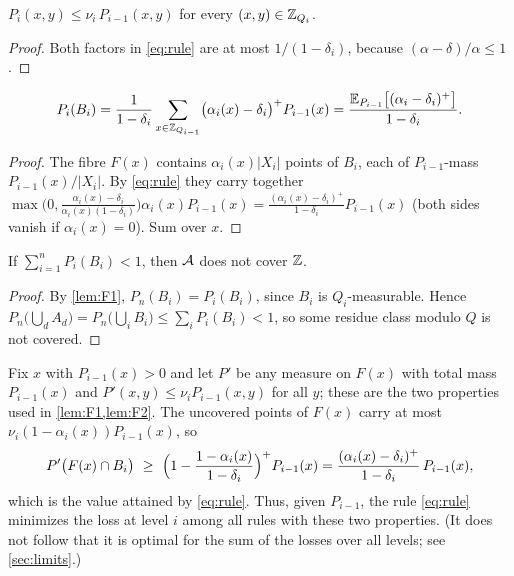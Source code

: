 \begin{lemma}\label{lem:F2}
$P_i(x,y)\le\nu_i\,P_{i-1}(x,y)$ for every $(x,y)\in\mathbb{Z}_{Q_i}$.
\end{lemma}

\begin{proof}
Both factors in \eqref{eq:rule} are at most $1/(1-\delta_i)$, because $(\alpha-\delta)/\alpha\le1$.
\end{proof}

\begin{lemma}\label{lem:F3}
\[
  P_i(B_i)=\frac1{1-\delta_i}\sum_{x\in\mathbb{Z}_{Q_{i-1}}}\bigl(\alpha_i(x)-\delta_i\bigr)^+P_{i-1}(x)
  =\frac{\mathbb{E}_{P_{i-1}}\bigl[(\alpha_i-\delta_i)^+\bigr]}{1-\delta_i}.
\]
\end{lemma}

\begin{proof}
The fibre $F(x)$ contains $\alpha_i(x)|X_i|$ points of $B_i$, each of $P_{i-1}$-mass $P_{i-1}(x)/|X_i|$. By
\eqref{eq:rule} they carry together
$\max\bigl(0,\frac{\alpha_i(x)-\delta_i}{\alpha_i(x)(1-\delta_i)}\bigr)\alpha_i(x)P_{i-1}(x)
=\frac{(\alpha_i(x)-\delta_i)^+}{1-\delta_i}P_{i-1}(x)$ (both sides vanish if $\alpha_i(x)=0$). Sum over $x$.
\end{proof}

\begin{proposition}\label{prop:F4}
If $\sum_{i=1}^nP_i(B_i)<1$, then $\mathcal{A}$ does not cover $\mathbb{Z}$.
\end{proposition}

\begin{proof}
By \cref{lem:F1}, $P_n(B_i)=P_i(B_i)$, since $B_i$ is $Q_i$-measurable. Hence
$P_n\bigl(\bigcup_dA_d\bigr)=P_n\bigl(\bigcup_iB_i\bigr)\le\sum_iP_i(B_i)<1$, so some residue class modulo $Q$ is
not covered.
\end{proof}

\begin{remark}\label{rem:rule-optimal}
Fix $x$ with $P_{i-1}(x)>0$ and let $P'$ be any measure on $F(x)$ with total mass $P_{i-1}(x)$ and
$P'(x,y)\le\nu_iP_{i-1}(x,y)$ for all $y$; these are the two properties used in
\cref{lem:F1,lem:F2}. The uncovered points of $F(x)$ carry at most $\nu_i(1-\alpha_i(x))P_{i-1}(x)$, so
\[
  P'\bigl(F(x)\cap B_i\bigr)\ \ge\ \Bigl(1-\frac{1-\alpha_i(x)}{1-\delta_i}\Bigr)^+P_{i-1}(x)
  =\frac{(\alpha_i(x)-\delta_i)^+}{1-\delta_i}\,P_{i-1}(x),
\]
which is the value attained by \eqref{eq:rule}. Thus, given $P_{i-1}$, the rule \eqref{eq:rule} minimizes the loss
at level $i$ among all rules with these two properties. (It does not follow that it is optimal for the sum of the
losses over all levels; see \cref{sec:limits}.)
\end{remark}

